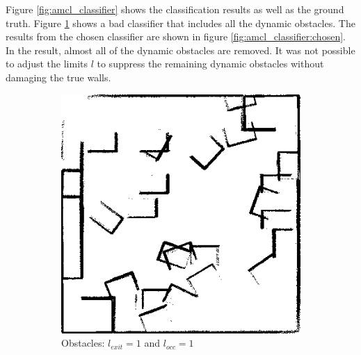 Figure \ref{fig:amcl_classifier} shows the classification results as well as the ground truth. 
Figure \ref{fig:amcl_classifier:worst} shows a bad classifier that includes all the dynamic obstacles. 
The results from the chosen classifier are shown in figure \ref{fig:amcl_classifier:chosen}. In the result, almost all of the dynamic obstacles are removed. It was not possible to adjust the limits $l$ to suppress the remaining dynamic obstacles without damaging the true walls.
%
%
\begin{figure}[htbp]
	\label{fig:amcl_classifier}
	\begin{subfigure}[t]{0.3\linewidth}
		\centering
		\includegraphics[width=1\linewidth]{chapters/cost_interpretation/figures/occ_above_0_classifier.png}
		\caption{Obstacles: $l_{exit} = 1$ and $l_{occ} = 1$}
		\label{fig:amcl_classifier:worst}
	\end{subfigure}
	\hspace*{\fill}
	\begin{subfigure}[t]{0.3\linewidth}
		\centering

\end{subfigure}
\end{figure}
